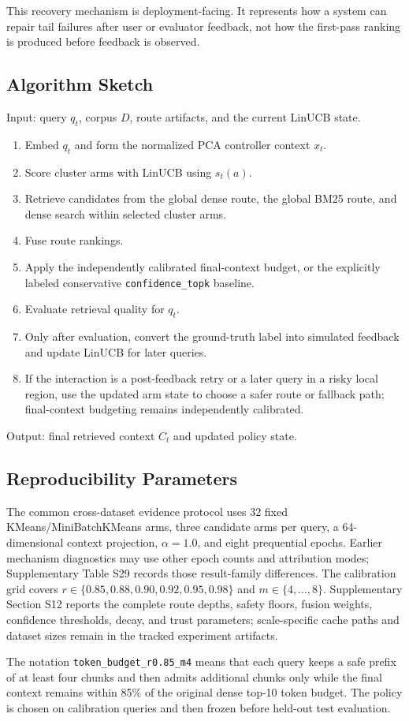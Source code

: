 This recovery mechanism is deployment-facing. It represents how a system can repair tail failures after user or evaluator feedback, not how the first-pass ranking is produced before feedback is observed.

\subsection{Algorithm Sketch}
\label{sec:04-method:algorithm-sketch}

Input: query $q_t$, corpus $D$, route artifacts, and the current LinUCB state.

\begin{enumerate}
\item Embed $q_t$ and form the normalized PCA controller context $x_t$.
\item Score cluster arms with LinUCB using $s_t(a)$.
\item Retrieve candidates from the global dense route, the global BM25 route, and dense search within selected cluster arms.
\item Fuse route rankings.
\item Apply the independently calibrated final-context budget, or the explicitly labeled conservative \nolinkurl{confidence_topk} baseline.
\item Evaluate retrieval quality for $q_t$.
\item Only after evaluation, convert the ground-truth label into simulated feedback and update LinUCB for later queries.
\item If the interaction is a post-feedback retry or a later query in a risky local region, use the updated arm state to choose a safer route or fallback path; final-context budgeting remains independently calibrated.
\end{enumerate}

Output: final retrieved context $C_t$ and updated policy state.

\subsection{Reproducibility Parameters}
\label{sec:04-method:reproducibility-parameters}

The common cross-dataset evidence protocol uses 32 fixed KMeans/MiniBatchKMeans arms, three candidate arms per query, a 64-dimensional context projection, $\alpha=1.0$, and eight prequential epochs. Earlier mechanism diagnostics may use other epoch counts and attribution modes; Supplementary Table S29 records those result-family differences. The calibration grid covers $r \in \{0.85,0.88,0.90,0.92,0.95,0.98\}$ and $m \in \{4,\ldots,8\}$. Supplementary Section S12 reports the complete route depths, safety floors, fusion weights, confidence thresholds, decay, and trust parameters; scale-specific cache paths and dataset sizes remain in the tracked experiment artifacts.

The notation \nolinkurl{token_budget_r0.85_m4} means that each query keeps a safe prefix of at least four chunks and then admits additional chunks only while the final context remains within 85\% of the original dense top-10 token budget. The policy is chosen on calibration queries and then frozen before held-out test evaluation.

